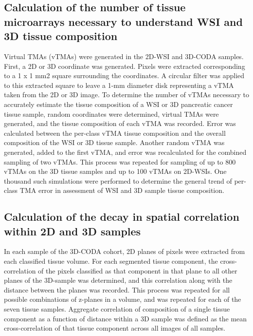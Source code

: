 \begin{refsection}
    \subsection{Calculation of the number of tissue microarrays necessary to understand WSI and 3D tissue composition}
    Virtual TMAs (vTMAs) were generated in the 2D-WSI and 3D-CODA samples. First, a 2D or 3D coordinate was generated. Pixels were extracted corresponding to a 1 x 1 mm2 square surrounding the coordinates. A circular filter was applied to this extracted square to leave a 1-mm diameter disk representing a vTMA taken from the 2D or 3D image. To determine the number of vTMAs necessary to accurately estimate the tissue composition of a WSI or 3D pancreatic cancer tissue sample, random coordinates were determined, virtual TMAs were generated, and the tissue composition of each vTMA was recorded. Error was calculated between the per-class vTMA tissue composition and the overall composition of the WSI or 3D tissue sample. Another random vTMA was generated, added to the first vTMA, and error was recalculated for the combined sampling of two vTMAs. This process was repeated for sampling of up to 800 vTMAs on the 3D tissue samples and up to 100 vTMAs on 2D-WSIs. One thousand such simulations were performed to determine the general trend of per-class TMA error in assessment of WSI and 3D sample tissue composition.
    
    \subsection{Calculation of the decay in spatial correlation within 2D and 3D samples}
    In each sample of the 3D-CODA cohort, 2D planes of pixels were extracted from each classified tissue volume. For each segmented tissue component, the cross-correlation of the pixels classified as that component in that plane to all other planes of the 3D-sample was determined, and this correlation along with the distance between the planes was recorded. This process was repeated for all possible combinations of z-planes in a volume, and was repeated for each of the seven tissue samples. Aggregate correlation of composition of a single tissue component as a function of distance within a 3D sample was defined as the mean cross-correlation of that tissue component across all images of all samples.
    

\end{refsection}
